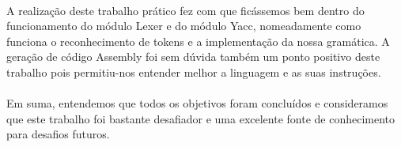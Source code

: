\documentclass[11pt,a4paper]{report}
\begin{document}
\paragraph{}
A realização deste trabalho prático fez com que ficássemos bem dentro do funcionamento do módulo Lexer e do módulo Yacc, nomeadamente como funciona o reconhecimento de tokens e a implementação da nossa gramática. A geração de código Assembly foi sem dúvida também um ponto positivo deste trabalho pois permitiu-nos entender melhor a linguagem e as suas instruções. 
\paragraph{}
Em suma, entendemos que todos os objetivos foram concluídos e consideramos que este trabalho foi bastante desafiador e uma excelente fonte de conhecimento para desafios futuros. 
\end{document}
